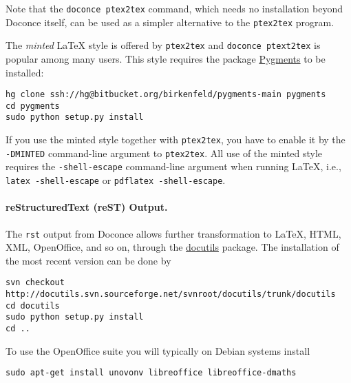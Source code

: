 \documentclass[twoside]{article}
\begin{document}
Note that the {\fontsize{10pt}{10pt}\verb!doconce ptex2tex!} command, which needs no installation
beyond Doconce itself, can be used as a simpler alternative to the {\fontsize{10pt}{10pt}\verb!ptex2tex!}
program.

The \emph{minted} {\LaTeX} style is offered by {\fontsize{10pt}{10pt}\verb!ptex2tex!} and {\fontsize{10pt}{10pt}\verb!doconce ptext2tex!}
is popular among many
users. This style requires the package \href{{http://pygments.org}}{Pygments}
to be installed:
\vspace{4pt}
\begin{Verbatim}[numbers=none,frame=lines,label=\fbox{{\tiny Terminal}},fontsize=\fontsize{9pt}{9pt},
labelposition=topline,framesep=2.5mm,framerule=0.7pt]
hg clone ssh://hg@bitbucket.org/birkenfeld/pygments-main pygments
cd pygments
sudo python setup.py install
\end{Verbatim}

If you use the minted style together with {\fontsize{10pt}{10pt}\verb!ptex2tex!}, you have to
enable it by the {\fontsize{10pt}{10pt}\verb!-DMINTED!} command-line argument to {\fontsize{10pt}{10pt}\verb!ptex2tex!}.  All
use of the minted style requires the {\fontsize{10pt}{10pt}\verb!-shell-escape!} command-line
argument when running {\LaTeX}, i.e., {\fontsize{10pt}{10pt}\verb!latex -shell-escape!} or {\fontsize{10pt}{10pt}\verb!pdflatex -shell-escape!}.


\paragraph{reStructuredText (reST) Output.}
The {\fontsize{10pt}{10pt}\verb!rst!} output from Doconce allows further transformation to {\LaTeX},
HTML, XML, OpenOffice, and so on, through the \href{{http://docutils.sourceforge.net}}{docutils} package.  The installation of the
most recent version can be done by

\vspace{4pt}
\begin{Verbatim}[numbers=none,frame=lines,label=\fbox{{\tiny Terminal}},fontsize=\fontsize{9pt}{9pt},
labelposition=topline,framesep=2.5mm,framerule=0.7pt]
svn checkout http://docutils.svn.sourceforge.net/svnroot/docutils/trunk/docutils
cd docutils
sudo python setup.py install
cd ..
\end{Verbatim}
To use the OpenOffice suite you will typically on Debian systems install
\vspace{4pt}
\begin{Verbatim}[numbers=none,frame=lines,label=\fbox{{\tiny Terminal}},fontsize=\fontsize{9pt}{9pt},
labelposition=topline,framesep=2.5mm,framerule=0.7pt]
sudo apt-get install unovonv libreoffice libreoffice-dmaths
\end{Verbatim}
\end{document}
